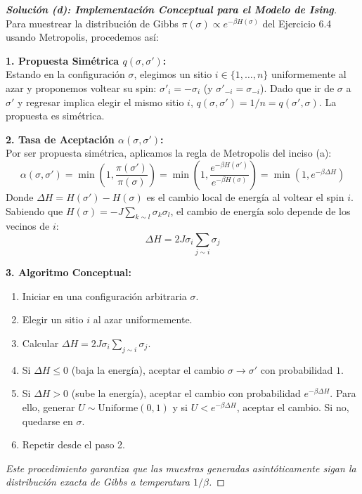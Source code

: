 \documentclass[10pt,a4paper]{article}
\begin{document}
\vspace{5mm}

\begin{proof}[\textbf{Solución (d): Implementación Conceptual para el Modelo de Ising}]
    Para muestrear la distribución de Gibbs $\pi(\sigma) \propto e^{-\beta H(\sigma)}$ del Ejercicio 6.4 usando Metropolis, procedemos así:
    
    \textbf{1. Propuesta Simétrica $q(\sigma, \sigma')$:} \\
    Estando en la configuración $\sigma$, elegimos un sitio $i \in \{1, \dots, n\}$ uniformemente al azar y proponemos voltear su spin: $\sigma'_i = -\sigma_i$ (y $\sigma'_{-i} = \sigma_{-i}$).
    Dado que ir de $\sigma$ a $\sigma'$ y regresar implica elegir el mismo sitio $i$, $q(\sigma, \sigma') = 1/n = q(\sigma', \sigma)$. La propuesta es simétrica.
    
    \textbf{2. Tasa de Aceptación $\alpha(\sigma, \sigma')$:} \\
    Por ser propuesta simétrica, aplicamos la regla de Metropolis del inciso (a):
    \[ \alpha(\sigma, \sigma') = \min\left(1, \frac{\pi(\sigma')}{\pi(\sigma)}\right) = \min\left(1, \frac{e^{-\beta H(\sigma')}}{e^{-\beta H(\sigma)}}\right) = \min\left(1, e^{-\beta \Delta H}\right) \]
    Donde $\Delta H = H(\sigma') - H(\sigma)$ es el cambio local de energía al voltear el spin $i$. Sabiendo que $H(\sigma) = -J \sum_{k \sim l} \sigma_k \sigma_l$, el cambio de energía solo depende de los vecinos de $i$:
    \[ \Delta H = 2J \sigma_i \sum_{j \sim i} \sigma_j \]
    
    \textbf{3. Algoritmo Conceptual:}
    \begin{enumerate}
        \item Iniciar en una configuración arbitraria $\sigma$.
        \item Elegir un sitio $i$ al azar uniformemente.
        \item Calcular $\Delta H = 2J \sigma_i \sum_{j \sim i} \sigma_j$.
        \item Si $\Delta H \le 0$ (baja la energía), aceptar el cambio $\sigma \to \sigma'$ con probabilidad $1$.
        \item Si $\Delta H > 0$ (sube la energía), aceptar el cambio con probabilidad $e^{-\beta \Delta H}$. Para ello, generar $U \sim \text{Uniforme}(0,1)$ y si $U < e^{-\beta \Delta H}$, aceptar el cambio. Si no, quedarse en $\sigma$.
        \item Repetir desde el paso 2.
    \end{enumerate}
    \textit{Este procedimiento garantiza que las muestras generadas asintóticamente sigan la distribución exacta de Gibbs a temperatura $1/\beta$.}
\end{proof}
\end{document}
